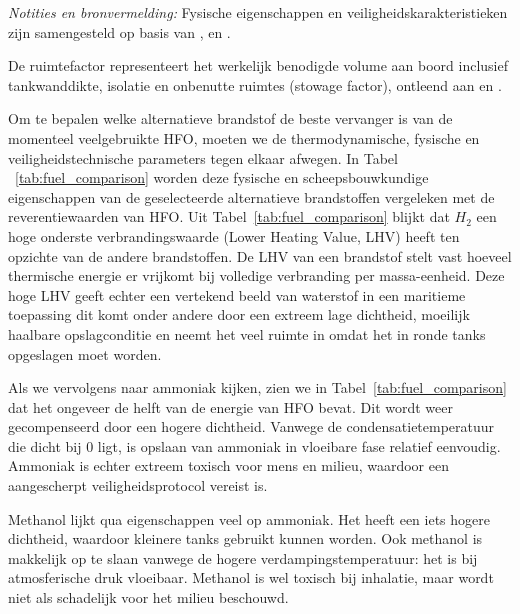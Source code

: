 \documentclass[a4paper]{IMDC2024}
\begin{document}
\begin{table}[H]
\begin{threeparttable}
\begin{tabular}{p{2.6cm} c c c p{2.4cm} c p{4.2cm}}
\hline\hline
\end{tabular}
\begin{tablenotes}
    \footnotesize
    \item \textit{Notities en bronvermelding:} Fysische eigenschappen en veiligheidskarakteristieken zijn samengesteld op basis van \citet{vanhoecke2021challenges}, \citet{vidovic2023} en \citet{charvalos2025}.
    \item[a] De ruimtefactor representeert het werkelijk benodigde volume aan boord inclusief tankwanddikte, isolatie en onbenutte ruimtes (stowage factor), ontleend aan \citet{mckenney2024} en \citet{dimicco2024}.
\end{tablenotes}
\end{threeparttable}
\end{table}

\label{sec:ontwerpmethodiek}

Om te bepalen welke alternatieve brandstof de beste vervanger is van de momenteel veelgebruikte HFO, moeten we de thermodynamische, fysische en veiligheidstechnische parameters tegen elkaar afwegen. In Tabel ~\ref{tab:fuel_comparison} worden deze fysische en scheepsbouwkundige eigenschappen van de geselecteerde alternatieve brandstoffen vergeleken met de reverentiewaarden van HFO. Uit Tabel~\ref{tab:fuel_comparison} blijkt dat $H_2$ een hoge onderste verbrandingswaarde (Lower Heating Value, LHV) heeft ten opzichte van de andere brandstoffen. De LHV van een brandstof stelt vast hoeveel thermische energie er vrijkomt bij volledige verbranding per massa-eenheid. Deze hoge LHV geeft echter een vertekend beeld van waterstof in een maritieme toepassing dit komt onder andere door een extreem lage dichtheid, moeilijk haalbare opslagconditie en neemt het veel ruimte in omdat het in ronde tanks opgeslagen moet worden.

Als we vervolgens naar ammoniak kijken, zien we in Tabel~\ref{tab:fuel_comparison} dat het ongeveer de helft van de energie van HFO bevat. Dit wordt weer gecompenseerd door een hogere dichtheid. Vanwege de condensatietemperatuur die dicht bij 0 ligt, is opslaan van ammoniak in vloeibare fase relatief eenvoudig. Ammoniak is echter extreem toxisch voor mens en milieu, waardoor een aangescherpt veiligheidsprotocol vereist is.

Methanol lijkt qua eigenschappen veel op ammoniak. Het heeft een iets hogere dichtheid, waardoor kleinere tanks gebruikt kunnen worden. Ook methanol is makkelijk op te slaan vanwege de hogere verdampingstemperatuur: het is bij atmosferische druk vloeibaar. Methanol is wel toxisch bij inhalatie, maar wordt niet als schadelijk voor het milieu beschouwd.
\end{document}
